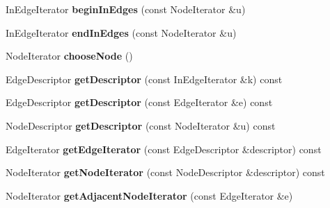 \begin{DoxyCompactItemize}
\item 
\hypertarget{class_adjacency_list_impl_af422503a99c4f3fa8f96e0d3d5f3de65}{
InEdgeIterator {\bfseries beginInEdges} (const NodeIterator \&u)}
\label{class_adjacency_list_impl_af422503a99c4f3fa8f96e0d3d5f3de65}

\item 
\hypertarget{class_adjacency_list_impl_a7004b6beb38081b6e78a7e0121d45705}{
InEdgeIterator {\bfseries endInEdges} (const NodeIterator \&u)}
\label{class_adjacency_list_impl_a7004b6beb38081b6e78a7e0121d45705}

\item 
\hypertarget{class_adjacency_list_impl_aad20cd3c45da5d86d1929130d9f1c6a9}{
NodeIterator {\bfseries chooseNode} ()}
\label{class_adjacency_list_impl_aad20cd3c45da5d86d1929130d9f1c6a9}

\item 
\hypertarget{class_adjacency_list_impl_af1eac485075711a18e9f80a938f8bd62}{
EdgeDescriptor {\bfseries getDescriptor} (const InEdgeIterator \&k) const }
\label{class_adjacency_list_impl_af1eac485075711a18e9f80a938f8bd62}

\item 
\hypertarget{class_adjacency_list_impl_a481b6ee597b2b69c80db9a7e0f5aa96f}{
EdgeDescriptor {\bfseries getDescriptor} (const EdgeIterator \&e) const }
\label{class_adjacency_list_impl_a481b6ee597b2b69c80db9a7e0f5aa96f}

\item 
\hypertarget{class_adjacency_list_impl_a6c5f9afd667fa3f55f7f857af53bbd49}{
NodeDescriptor {\bfseries getDescriptor} (const NodeIterator \&u) const }
\label{class_adjacency_list_impl_a6c5f9afd667fa3f55f7f857af53bbd49}

\item 
\hypertarget{class_adjacency_list_impl_a4d8351c23af0cd99f96112243f0a2332}{
EdgeIterator {\bfseries getEdgeIterator} (const EdgeDescriptor \&descriptor) const }
\label{class_adjacency_list_impl_a4d8351c23af0cd99f96112243f0a2332}

\item 
\hypertarget{class_adjacency_list_impl_a4d0745140956a5ab7a8e68fa7cf0864c}{
NodeIterator {\bfseries getNodeIterator} (const NodeDescriptor \&descriptor) const }
\label{class_adjacency_list_impl_a4d0745140956a5ab7a8e68fa7cf0864c}

\item 
\hypertarget{class_adjacency_list_impl_a4ae8c64ae8e3155e41c95174a6f37ddf}{
NodeIterator {\bfseries getAdjacentNodeIterator} (const EdgeIterator \&e)}
\label{class_adjacency_list_impl_a4ae8c64ae8e3155e41c95174a6f37ddf}


\end{DoxyCompactItemize}
